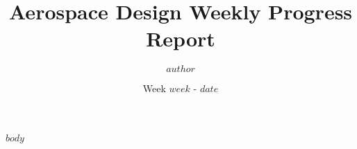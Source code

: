 \documentclass[10pt]{article}
\title{Aerospace Design Weekly Progress Report}
\author{$author$}
\date{Week $week$ - $date$}
\begin{document}
\maketitle

$body$
\end{document}
